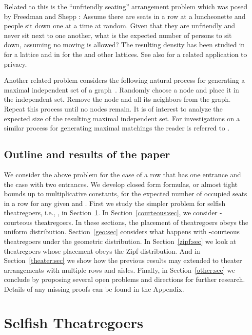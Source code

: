 \documentclass[11pt]{llncs}
\begin{document}
Related to this is the ``unfriendly seating'' arrangement problem 
which
was posed by
Freedman and Shepp \cite{freedman}:
Assume there are  seats in a row at a 
luncheonette and people sit down one at a time at random.
Given that 
they are unfriendly and never sit next to one another,
what is the expected number
of persons to sit down, assuming no moving is allowed?
The resulting density has been studied in
\cite{freedman,friedman,mackenzie} for a  lattice and 
in \cite{georgiou2009random} for the  and
other lattices.
See also \cite{kk} for a related application to privacy.

Another related problem considers the following natural 
process for generating a maximal independent set of a 
graph~\cite{mitzenmacher}.
Randomly choose a node and place it in the independent set. 
Remove the node and all its neighbors
from the graph. Repeat this process until no nodes remain. 
It is of interest to analyze the expected size of the
resulting maximal independent set. For investigations on a similar
process for generating maximal matchings 
the reader is referred to \cite{aronson1995randomized,dyer1991randomized}.

\subsection{Outline and results of the paper}

We consider the above problem for the case of
a row that has one entrance and the case with two entrances.   We
develop closed form formulas, or almost tight bounds up to multiplicative constants, for the expected
number of occupied seats in a row for any given  and .
First we study  
the simpler problem
for selfish theatregoers, i.e., ,
in Section~\ref{selfish:sec}. In
Section~\ref{courteous:sec}, we consider -courteous theatregoers.
In these sections, the placement of theatregoers obeys the
uniform distribution.
Section~\ref{geo:sec} considers what happens with -courteous theatregoers under the
geometric distribution.
In Section~\ref{zipf:sec} we look at  theatregoers  whose
placement obeys the Zipf distribution.
And in Section~\ref{theater:sec} we show how the previous results may extended 
to theater arrangements with multiple rows and aisles.
Finally, in Section~\ref{other:sec} we conclude by proposing several open problems
and directions for further research. Details of any missing proofs
can be found in the Appendix.

\section{Selfish Theatregoers}
\label{selfish:sec}
\end{document}
